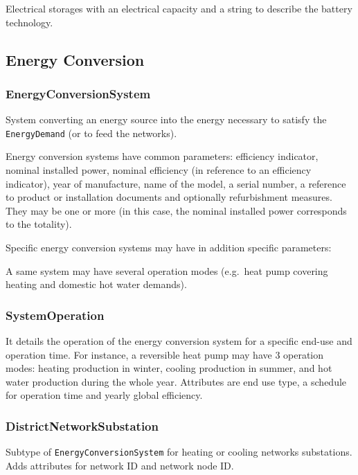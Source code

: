 \documentclass[a4paper,12pt]{article}
\begin{document}
Electrical storages with an electrical capacity and a string to describe
the battery technology.

\subsection{Energy Conversion}\label{energy-conversion}

\subsubsection{EnergyConversionSystem}\label{energyconversionsystem}

System converting an energy source into the energy necessary to satisfy
the \texttt{EnergyDemand} (or to feed the networks).

Energy conversion systems have common parameters: efficiency indicator,
nominal installed power, nominal efficiency (in reference to an
efficiency indicator), year of manufacture, name of the model, a serial
number, a reference to product or installation documents and optionally
refurbishment measures. They may be one or more (in this case, the
nominal installed power corresponds to the totality).

Specific energy conversion systems may have in addition specific
parameters:

A same system may have several operation modes (e.g.~heat pump covering
heating and domestic hot water demands).

\subsubsection{SystemOperation}\label{systemoperation}

It details the operation of the energy conversion system for a specific
end-use and operation time. For instance, a reversible heat pump may
have 3 operation modes: heating production in winter, cooling production
in summer, and hot water production during the whole year. Attributes
are end use type, a schedule for operation time and yearly global
efficiency.

\subsubsection{DistrictNetworkSubstation}\label{districtnetworksubstation}

Subtype of \texttt{EnergyConversionSystem} for heating or cooling
networks substations. Adds attributes for network ID and network node
ID.
\end{document}
